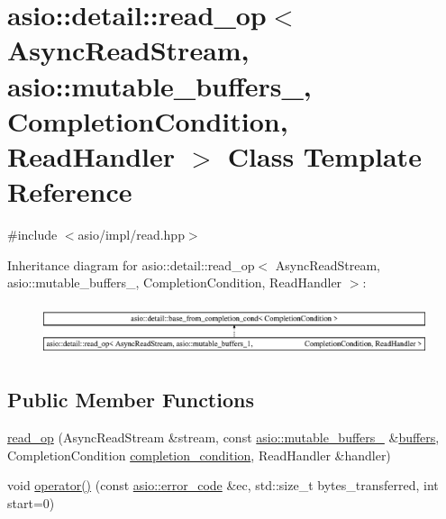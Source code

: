 \hypertarget{classasio_1_1detail_1_1read__op_3_01_async_read_stream_00_01asio_1_1mutable__buffers__1_00_01_018ff00a3c2aa5481d9cf38a1ea7821a38}{}\section{asio\+:\+:detail\+:\+:read\+\_\+op$<$ Async\+Read\+Stream, asio\+:\+:mutable\+\_\+buffers\+\_, Completion\+Condition, Read\+Handler $>$ Class Template Reference}
\label{classasio_1_1detail_1_1read__op_3_01_async_read_stream_00_01asio_1_1mutable__buffers__1_00_01_018ff00a3c2aa5481d9cf38a1ea7821a38}


{\ttfamily \#include $<$asio/impl/read.\+hpp$>$}

Inheritance diagram for asio\+:\+:detail\+:\+:read\+\_\+op$<$ Async\+Read\+Stream, asio\+:\+:mutable\+\_\+buffers\+\_, Completion\+Condition, Read\+Handler $>$\+:\begin{figure}[H]
\begin{center}
\leavevmode
\includegraphics[height=1.515562cm]{classasio_1_1detail_1_1read__op_3_01_async_read_stream_00_01asio_1_1mutable__buffers__1_00_01_018ff00a3c2aa5481d9cf38a1ea7821a38}
\end{center}
\end{figure}
\subsection*{Public Member Functions}
\begin{DoxyCompactItemize}
\item 
\hyperlink{classasio_1_1detail_1_1read__op_3_01_async_read_stream_00_01asio_1_1mutable__buffers__1_00_01_018ff00a3c2aa5481d9cf38a1ea7821a38_afa1f376bf655b4dea2d4a5022f74724b}{read\+\_\+op} (Async\+Read\+Stream \&stream, const \hyperlink{classasio_1_1mutable__buffers__1}{asio\+::mutable\+\_\+buffers\+\_} \&\hyperlink{group__async__read_ga54dede45c3175148a77fe6635222c47d}{buffers}, Completion\+Condition \hyperlink{group__async__read_gae2e215d5013596cc2b385bb6c13fa518}{completion\+\_\+condition}, Read\+Handler \&handler)
\item 
void \hyperlink{classasio_1_1detail_1_1read__op_3_01_async_read_stream_00_01asio_1_1mutable__buffers__1_00_01_018ff00a3c2aa5481d9cf38a1ea7821a38_acc7bc80ea6c7bfabeaa25b137fc744a2}{operator()} (const \hyperlink{classasio_1_1error__code}{asio\+::error\+\_\+code} \&ec, std\+::size\+\_\+t bytes\+\_\+transferred, int start=0)
\end{DoxyCompactItemize}
